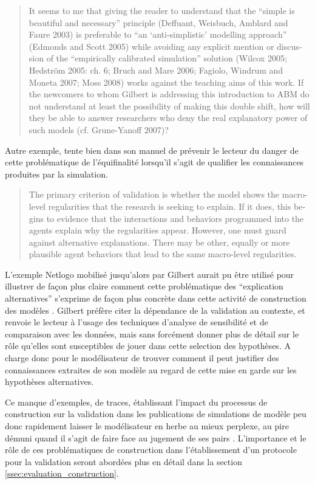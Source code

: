 \foreignblockquote{english}[\cite{Manzo2007a}]{It seems to me that giving the reader to understand that the \enquote{simple is beautiful and necessary} principle (Deffuant, Weisbuch, Amblard and Faure 2003) is preferable to \enquote{an \enquote{anti-simplistic} modelling approach} (Edmonds and Scott 2005) while avoiding any explicit mention or discussion of the \enquote{empirically
calibrated simulation} solution (Wilcox 2005; Hedström 2005: ch. 6; Bruch and Mare 2006; Fagiolo, Windrum and Moneta 2007; Moss 2008) works against the teaching aims of this work. If the newcomers to whom Gilbert is addressing this introduction to ABM do not understand at least the possibility of making this double shift, how will they be able to answer researchers who deny the real explanatory power of such models (cf. Grune-Yanoff 2007)?}

Autre exemple, \textcite{Gilbert2008} tente bien dans son manuel de prévenir le lecteur du danger de cette problématique de l'équifinalité lorsqu'il s'agit de qualifier les connaissances produites par la simulation.

\foreignblockquote{english}[{\cite[31-32]{Gilbert2008}}]{The primary criterion of validation is whether the model shows the macro-level regularities that the research is seeking to explain. If it does, this begins to evidence that the interactions and behaviors programmed into the agents explain why the regularities appear. However, one must guard against alternative explanations. There may be other, equally or more plausible agent behaviors that lead to the same macro-level regularities.}

L'exemple Netlogo mobilisé jusqu'alors par Gilbert aurait pu être utilisé pour illustrer de façon plus claire comment cette problématique des \enquote{explication alternatives} s'exprime de façon plus concrète dans cette activité de construction des modèles . Gilbert préfère citer la dépendance de la validation au contexte, et renvoie le lecteur à l'usage des techniques d'analyse de sensibilité et de comparaison avec les données, mais sans forcément donner plus de détail sur le rôle qu'elles sont susceptibles de jouer dans cette selection des hypothèses. A charge donc pour le modélisateur de trouver comment il peut justifier des connaissances extraites de son modèle au regard de cette mise en garde sur les hypothèses alternatives.

Ce manque d'exemples, de traces, établissant l'impact du processus de construction sur la validation dans les publications de simulations de modèle peu donc rapidement laisser le modélisateur en herbe au mieux perplexe, au pire démuni quand il s'agit de faire face au jugement de ses pairs \autocite{Manzo2007a}. L'importance et le rôle de ces problématiques de construction dans l'établissement d'un protocole pour la validation seront abordées plus en détail dans la section \ref{ssec:evaluation_construction}.

